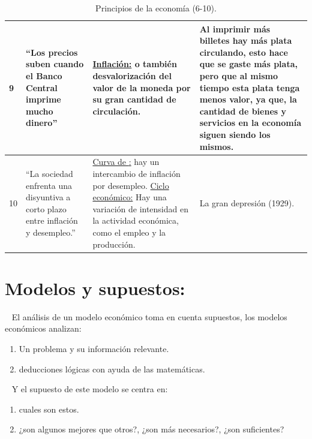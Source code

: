 \documentclass[
  letterpaper,
  DIV=11,
  numbers=noendperiod]{scrreport}
\providecommand{\tightlist}{%
  \setlength{\itemsep}{0pt}\setlength{\parskip}{0pt}}\usepackage{longtable,booktabs,array}
\begin{document}
\begin{table}[H]
\begin{tabular}{|p{16mm}|p{30mm}|p{59mm}|p{40mm}|}
        9 & \hspace{2mm} “Los precios suben cuando el Banco Central imprime mucho dinero” & \hspace{2mm} \underline{Inflación:} o también desvalorización del valor de la moneda por su gran cantidad de circulación. & \hspace{2mm} Al imprimir más billetes hay más plata circulando, esto hace que se gaste más plata, pero que al mismo tiempo esta plata tenga menos valor, ya que, la cantidad de bienes y servicios en la economía siguen siendo los mismos. \\ \hline
        10 & \hspace{2mm} “La sociedad enfrenta una disyuntiva a corto plazo entre inflación y desempleo.” & \hspace{2mm} \underline{Curva de \cite{phillips_relation_1958}:} hay un intercambio de inflación por desempleo. \underline{Ciclo económico:} Hay una variación de intensidad en la actividad económica, como el empleo y la producción. & \hspace{2mm} La gran depresión (1929). \\ \hline
    \end{tabular}
    \caption{Principios de la economía (6-10).}
    \label{tabla:final}
\end{table}

\hypertarget{modelos-y-supuestos}{%
\section{Modelos y supuestos:}\label{modelos-y-supuestos}}

~ El análisis de un modelo económico toma en cuenta supuestos, los
modelos económicos analizan:

\begin{enumerate}
\def\labelenumi{\arabic{enumi}.}
\tightlist
\item
  Un problema y su información relevante.
\item
  deducciones lógicas con ayuda de las matemáticas.
\end{enumerate}

~ Y el supuesto de este modelo se centra en:

\begin{enumerate}
\def\labelenumi{\arabic{enumi}.}
\tightlist
\item
  cuales son estos.
\item
  ¿son algunos mejores que otros?, ¿son más necesarios?, ¿son
  suficientes?
\end{enumerate}
\end{document}

